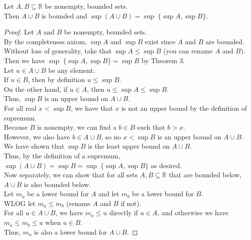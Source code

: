 \documentclass{article}
\newenvironment{theorem}[1]{\renewcommand\theinnercustomthm{#1}\innercustomthm}
  {\endinnercustomthm}
\begin{document}
\begin{theorem}{4}
    Let $A, B \subseteq \mathbb R$ be nonempty, bounded sets. \\
    Then $A \cup B$ is bounded and $\sup (A \cup B) = \sup \; \{\sup A, \sup B\}$.
\end{theorem}
\begin{proof}
    Let $A$ and $B$ be nonempty, bounded sets. \\
    By the completeness axiom, $\sup A$ and $\sup B$ exist since $A$ and $B$ are bounded. \\
    Without loss of generality, take that $\sup A \le \sup B$ (you can rename $A$ and $B$). \\
    Then we have $\sup \; \{\sup A, \sup B\} = \sup B$ by Theorem 3. \\
    Let $u \in A \cup B$ be any element. \\
    If $u \in B$, then by definition $u \le \sup B$. \\
    On the other hand, if $u \in A$, then $u \le \sup A \le \sup B$. \\
    Thus, $\sup B$ is an upper bound on $A \cup B$. \\
    For all real $x < \sup B$, we have that $x$ is not an upper bound by the definition of supremum.\\
    Because $B$ is nonempty, we can find a $b \in B$ such that $b > x$. \\
    However, we also have $b \in A \cup B$, so no $x < \sup B$ is an upper bound on $A \cup B$. \\
    We have shown that $\sup B$ is the least upper bound on $A \cup B$. \\ 
    Thus, by the definition of a supremum, $\sup(A\cup B) = \sup B = \sup \;\{\sup A, \sup B\}$ as desired. \\

    Now separately, we can show that for all sets $A,B\subseteq \mathbb R$ that are bounded below, $A \cup B$ is also bounded below. \\
    Let $m_a$ be a lower bound for $A$ and let $m_b$ be a lower bound for $B$. \\
    WLOG let $m_a \le m_b$ (rename $A$ and $B$ if not).\\ For all $u \in A\cup B$, we have $m_a \le u$ directly if $u \in A$, and otherwise we have $m_a \le m_b \le u$ when $u \in B$. \\
    Thus, $m_a$ is also a lower bound for $A \cup B$.
\end{proof}
\end{document}
